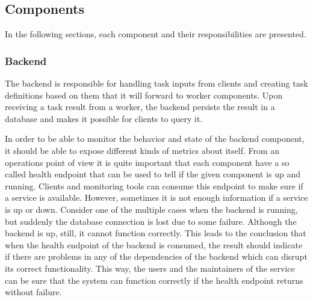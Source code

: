 \subsection{Components}

In the following sections, each component and their responsibilities are presented.

\subsubsection{Backend} \label{design-backend}

%

The backend is responsible for handling task inputs from clients and creating task definitions based on them that it will forward to worker components. Upon receiving a task result from a worker, the backend persists the result in a database and makes it possible for clients to query it.

In order to be able to monitor the behavior and state of the backend component, it should be able to expose different kinds of metrics about itself. From an operations point of view it is quite important that each component have a so called health endpoint that can be used to tell if the given component is up and running. Clients and monitoring tools can consume this endpoint to make sure if a service is available. However, sometimes it is not enough information if a service is up or down. Consider one of the multiple cases when the backend is running, but suddenly the database connection is lost due to some failure. Although the backend is up, still, it cannot function correctly. This leads to the conclusion that when the health endpoint of the backend is consumed, the result should indicate if there are problems in any of the dependencies of the backend which can disrupt its correct functionality. This way, the users and the maintainers of the service can be sure that the system can function correctly if the health endpoint returns without failure.

